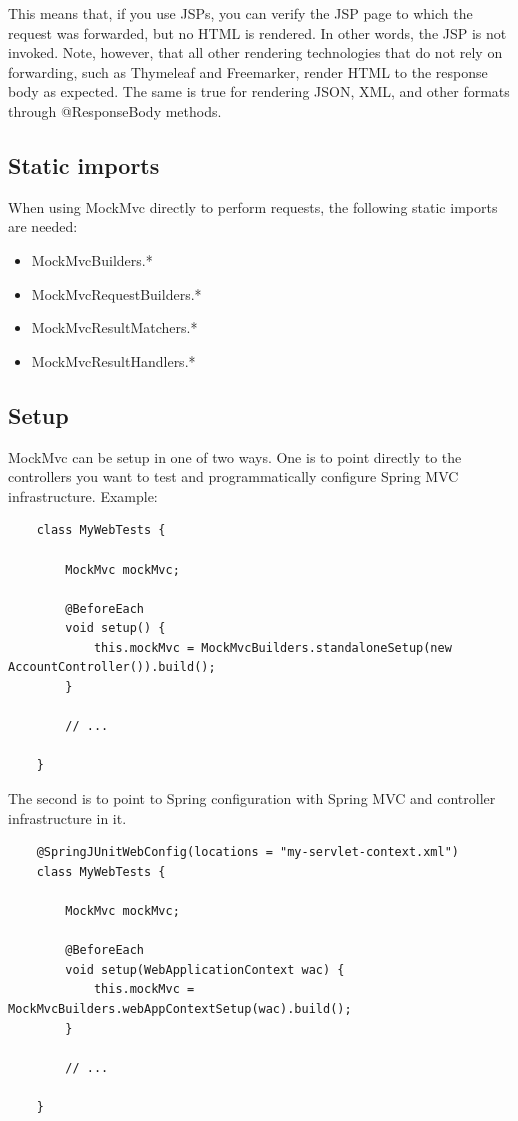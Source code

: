 \documentclass{scrartcl}
\begin{document}
This means that, if you use JSPs, you can verify the JSP page to which the request was forwarded, but no HTML is rendered. In other words, the JSP is not invoked. Note, however, that all other rendering technologies that do not rely on forwarding, such as Thymeleaf and Freemarker, render HTML to the response body as expected. The same is true for rendering JSON, XML, and other formats through @ResponseBody methods.

\subsection{Static imports}

When using MockMvc directly to perform requests, the following static imports are needed:

\begin{itemize}
    \item MockMvcBuilders.*

    \item MockMvcRequestBuilders.*

    \item MockMvcResultMatchers.*

    \item MockMvcResultHandlers.*
\end{itemize}

\subsection{Setup}

MockMvc can be setup in one of two ways. One is to point directly to the controllers you want to test and programmatically configure Spring MVC infrastructure. Example:

\begin{lstlisting}
    class MyWebTests {

        MockMvc mockMvc;

        @BeforeEach
        void setup() {
            this.mockMvc = MockMvcBuilders.standaloneSetup(new AccountController()).build();
        }

        // ...

    }
\end{lstlisting}

The second is to point to Spring configuration with Spring MVC and controller infrastructure in it.

\begin{lstlisting}
    @SpringJUnitWebConfig(locations = "my-servlet-context.xml")
    class MyWebTests {

        MockMvc mockMvc;

        @BeforeEach
        void setup(WebApplicationContext wac) {
            this.mockMvc = MockMvcBuilders.webAppContextSetup(wac).build();
        }

        // ...

    }
\end{lstlisting}
\end{document}
